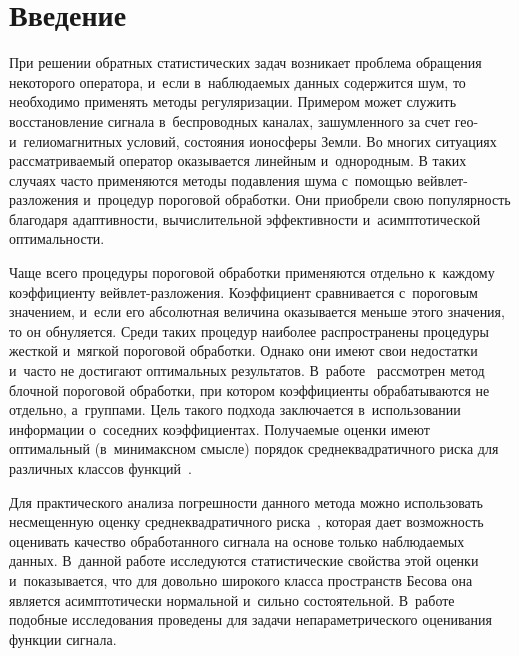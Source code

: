 
  
\vspace*{-6pt}



\thispagestyle{headings}

\begin{multicols}{2}

\label{st\stat}



\section{Введение}

При решении обратных статистических задач возникает проблема обращения 
некоторого оператора, и~если в~наблюдаемых данных содержится шум, то необходимо 
применять методы регуляризации.
Примером может служить восстановление сигнала в~беспроводных каналах, 
зашумленного за счет гео- и~гелиомагнитных условий, состояния ионосферы Земли.
Во многих ситуациях рассматриваемый оператор оказывается линейным и~однородным. 
В таких случаях часто применяются методы подавления шума с~помощью вейв\-лет-раз\-ло\-же\-ния и~процедур пороговой обработки. Они приобрели свою популярность 
благодаря адаптивности, вычислительной эффективности и~асимптотической 
оптимальности. 

Чаще всего процедуры пороговой обработки применяются отдельно 
к~каждому коэффициенту вейв\-лет-раз\-ло\-же\-ния. Коэффициент сравнивается с~пороговым 
значением, и~если его абсолютная величина оказывается меньше этого значения, то 
он обнуляется. Среди таких процедур наиболее распространены процедуры жест\-кой 
и~мягкой пороговой обработки. Однако они имеют свои недостатки и~часто не 
достигают оптимальных результатов. В~работе~\cite{HKP99} рассмотрен метод 
блочной пороговой обработки, при котором коэффициенты обрабатываются не 
отдельно, а~группами. Цель такого подхода заключается в~использовании информации 
о~соседних коэффициентах. По\-лу\-ча\-емые оценки имеют оптимальный (в~минимаксном 
смысле) порядок среднеквадратичного риска для различных классов функций~\cite{Cai99}.

Для практического анализа погрешности данного метода можно использовать 
несмещенную оценку среднеквадратичного риска~\cite{St81}, которая дает 
возможность оценивать качество обработанного сигнала на основе только 
наблюдаемых данных. В~данной работе исследуются статистические свойства этой 
оценки и~показывается, что для довольно широкого класса пространств Бесова она 
является асимптотически нормальной и~сильно состоятельной. В~работе~\cite{SH21} 
подобные исследования проведены для задачи непараметрического оценивания функции 
сигнала. 


\end{multicols}

